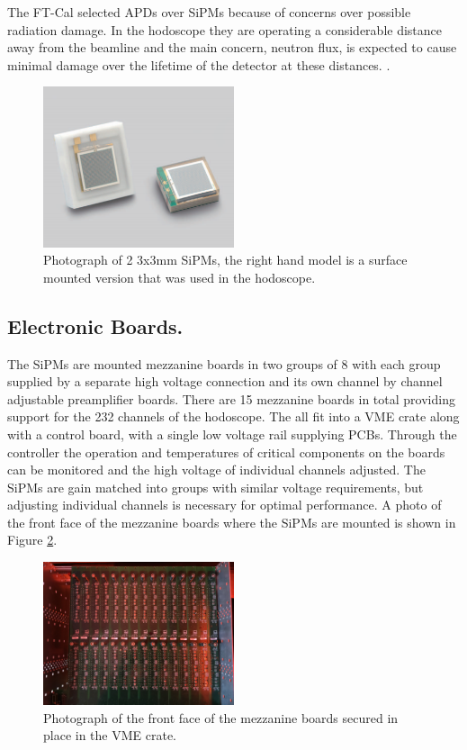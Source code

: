 The FT-Cal selected APDs over SiPMs because of concerns over possible radiation damage. In the hodoscope they are operating a considerable distance away from the beamline and the main concern, neutron flux, is expected to cause minimal damage over the lifetime of the detector at these distances. \cite{FTTDR2012}.

\begin{figure}
	\centering
	\includegraphics[width=0.5\textwidth]{ImgChap1/sipm}
	\caption{Photograph of 2 3x3mm SiPMs, the right hand model is a surface mounted version that was used in the hodoscope.}
	\label{sipm}
\end{figure}

\subsection{Electronic Boards.}

The SiPMs are mounted mezzanine boards in two groups of 8 with each group supplied by a separate high voltage connection and its own channel by channel adjustable preamplifier boards. There are 15 mezzanine boards in total providing support for the 232 channels of the hodoscope. The all fit into a VME crate along with a control board, with a single low voltage rail supplying PCBs. Through the controller the operation and temperatures of critical components on the boards can be monitored and the high voltage of individual channels adjusted. The SiPMs are gain matched into groups with similar voltage requirements, but adjusting individual channels is necessary for optimal performance. A photo of the front face of the mezzanine boards where the SiPMs are mounted is shown in Figure \ref{electronboards}.

\begin{figure}
	\centering
	\includegraphics[width=0.5\textwidth]{ImgChap1/mezzboards}
	\caption{Photograph of the front face of the mezzanine boards secured in place in the VME crate.}
	\label{electronboards}
\end{figure}

